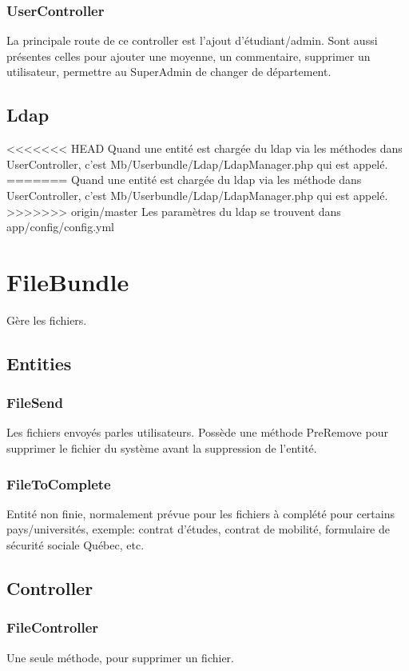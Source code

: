 \subsubsection{UserController}
La principale route de ce controller est l'ajout d'étudiant/admin.
Sont aussi présentes celles pour ajouter une moyenne, un commentaire, supprimer un utilisateur, permettre au SuperAdmin de changer de département.


\subsection{Ldap}
<<<<<<< HEAD
Quand une entité est chargée du ldap via les méthodes dans UserController, c'est Mb/Userbundle/Ldap/LdapManager.php qui est appelé.
=======
Quand une entité est chargée du ldap via les méthode dans UserController, c'est  Mb/Userbundle/Ldap/LdapManager.php qui est appelé.
>>>>>>> origin/master
Les paramètres du ldap se trouvent dans app/config/config.yml


\section{FileBundle}
Gère les fichiers.

\subsection{Entities}
\subsubsection{FileSend}
Les fichiers envoyés parles utilisateurs. Possède une méthode PreRemove pour supprimer le fichier du système avant la suppression de l'entité.

\subsubsection{FileToComplete}
Entité non finie, normalement prévue pour les fichiers à complété pour certains pays/universités, exemple: contrat d'études, contrat de mobilité, formulaire de sécurité sociale Québec, etc.


\subsection{Controller}
\subsubsection{FileController}
Une seule méthode, pour supprimer un fichier.


